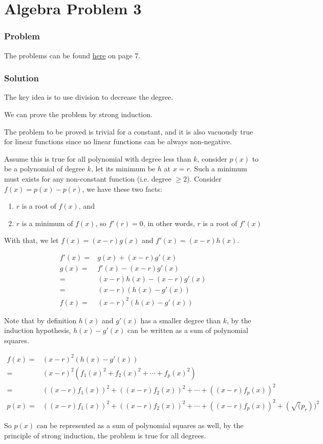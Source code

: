 \section*{Algebra Problem 3}
\subsubsection*{Problem}
The problems can be found \href{https://www.math.hkust.edu.hk/~makyli/190_2010Sp/problemBk.pdf}{here} on page 7.

\subsubsection*{Solution}
The key idea is to use division to decrease the degree.

We can prove the problem by strong induction.

The problem to be proved is trivial for a constant, and it is also vacuously true for linear functions since no linear functions can be always non-negative.

Assume this is true for all polynomial with degree less than $ k $, consider $ p(x) $ to be a polynomial of degree $ k $, let its minimum be $ h $ at $ x = r $. Such a minimum must exists for any non-constant function (i.e. degree $ \ge 2 $). Consider $ f(x) = p(x) - p(r) $, we have these two facts:

\begin{enumerate}
    \item{ $ r $ is a root of $ f(x) $, and}
    \item{ $ r $ is a minimum of $ f(x) $, so $ f'(r) = 0 $, in other words, $ r $ is a root of $ f'(x) $ }
\end{enumerate}

With that, we let $ f(x) = (x - r)g(x) $ and $ f'(x) = (x - r)h(x) $.

\begin{align*}
    f'(x) =& g(x) + (x - r)g'(x)        \\
     g(x) =& f'(x) - (x - r)g'(x)       \\
          =& (x - r)h(x) - (x - r)g'(x) \\
          =& (x - r)(h(x) - g'(x))      \\
     f(x) =& (x - r)^2(h(x) - g'(x))
\end{align*}

Note that by definition $ h(x) $ and $ g'(x) $ has a smaller degree than $ k $, by the induction hypothesis, $ h(x) - g'(x) $ can be written as a sum of polynomial squares.

\begin{align*}
  f(x) =& (x - r)^2(h(x) - g'(x)) \\
       =& (x - r)^2(f_1(x)^2 + f_2(x)^2 + \cdots + f_p(x)^2) \\
       =& ((x - r)f_1(x))^2 + ((x - r)f_2(x))^2 + \cdots + ((x - r)f_p(x))^2 \\
  p(x) =& ((x - r)f_1(x))^2 + ((x - r)f_2(x))^2 + \cdots + ((x - r)f_p(x))^2 + (\sqrt(p_r))^ 2
\end{align*}

So $ p(x) $ can be represented as a sum of polynomial squares as well, by the principle of strong induction, the problem is true for all degrees.